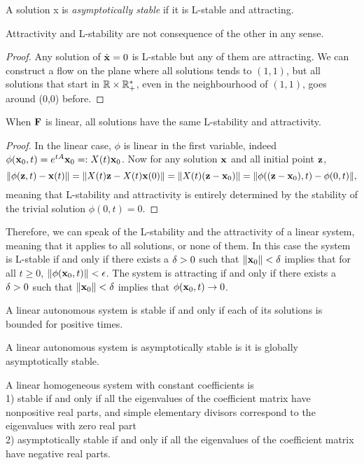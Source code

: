 \begin{definition}
    A solution x is \emph{asymptotically stable} if it is L-stable and attracting.
\end{definition}
\begin{lemme}
    Attractivity and L-stability are not consequence of the other in any sense. 
\end{lemme}
\begin{proof}
Any solution of $\dot{\mathbf{x}}=0$ is L-stable but any of them are attracting. We can construct a flow on the plane where all solutions tends to $(1,1)$, but all solutions that start in $\mathbb{R}\times\mathbb{R}_+^*$, even in the neighbourhood of $(1,1)$, goes around (0,0) before. 
\end{proof}
\begin{lemme}
    When $\mathbf{F}$ is linear, all solutions have the same L-stability and attractivity.
\end{lemme}
\begin{proof}
In the linear case, $\phi$ is linear in the first variable, indeed $\phi(\mathbf{x}_0,t) = e^{tA}\mathbf{x}_0 =: X(t)\mathbf{x}_0$. Now for any solution $\mathbf{x}$ and all initial point $\mathbf{z}$,
\[ \|\phi(\mathbf{z},t)-\mathbf{x}(t)\| = \|X(t)\mathbf{z}-X(t)\mathbf{x}(0)\| = \|X(t)(\mathbf{z}-\mathbf{x}_0)\| =\|\phi((\mathbf{z}-\mathbf{x}_0),t)-\phi(0,t)\|, \] meaning that L-stability and attractivity is entirely determined by the stability of the trivial solution $\phi(0,t)=0$.
\end{proof}
\begin{remarque}
    Therefore, we can speak of the L-stability and the attractivity of a linear system, meaning that it applies to all solutions, or none of them. In this case the system is L-stable if and only if there exists a $\delta>0$ such that $\|\mathbf{x}_0\|<\delta$ implies that for all $t\geq0$, $\|\phi(\mathbf{x}_0,t)\|<\epsilon$. The system is attracting if and only if there exists a $\delta>0$ such that $\|\mathbf{x}_0\|<\delta$ implies that $\phi(\mathbf{x}_0,t) \to 0$.
\end{remarque}
 
 \begin{theoreme}
 A linear autonomous system is stable if and only if each of its solutions is bounded for positive times.
 \end{theoreme}
  \begin{theoreme}
A linear autonomous system is asymptotically stable is it is globally asymptotically stable.
 \end{theoreme}
   \begin{theoreme}
A linear homogeneous system with constant coefficients is \\
1) stable if and only if all the eigenvalues of the coefficient matrix have nonpositive real parts, and simple elementary divisors correspond to the eigenvalues with zero real
part \\
2) asymptotically stable if and only if all the eigenvalues of the coefficient matrix
have negative real parts.
 \end{theoreme}